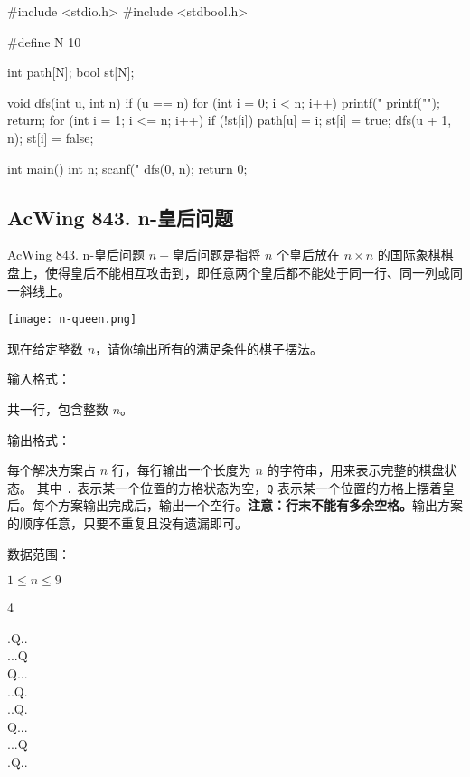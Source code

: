\begin{mycpptwocol}[排列数字]
    #include <stdio.h>
    #include <stdbool.h>

    #define N 10

    int path[N];
    bool st[N];

    void dfs(int u, int n)
        {
        if (u == n) {
            for (int i = 0; i < n; i++) {
                printf("%
            }
            printf("\n");
            return;
        }
        for (int i = 1; i <= n; i++) {
            if (!st[i]) {
                path[u] = i;
                st[i] = true;
                dfs(u + 1, n);
                st[i] = false;
            }
        }
    }

    int main()
        {
        int n;
        scanf("%
        dfs(0, n);
        return 0;
    }
\end{mycpptwocol}

\subsection{AcWing 843. n-皇后问题}
\begin{titledbox}{AcWing 843. n-皇后问题}
    $n-$皇后问题是指将 $n$ 个皇后放在 $n \times n$ 的国际象棋棋盘上，使得皇后不能相互攻击到，即任意两个皇后都不能处于同一行、同一列或同一斜线上。

    \texttt{[image: n-queen.png]}

    现在给定整数 $n$，请你输出所有的满足条件的棋子摆法。

    输入格式：

    共一行，包含整数 $n$。

    输出格式：

    每个解决方案占 $n$ 行，每行输出一个长度为 $n$ 的字符串，用来表示完整的棋盘状态。
    其中 \lstinline{.} 表示某一个位置的方格状态为空，\lstinline{Q} 表示某一个位置的方格上摆着皇后。每个方案输出完成后，输出一个空行。\textbf{注意：行末不能有多余空格。}输出方案的顺序任意，只要不重复且没有遗漏即可。

    数据范围：

    $1 \le n \le 9$

    \begin{inputblock}
        4
    \end{inputblock}
    \begin{outputblock}
        .Q.. \\
        ...Q \\
        Q... \\
        ..Q. \\

        ..Q. \\
        Q... \\
        ...Q \\
        .Q..
    \end{outputblock}
\end{titledbox}

